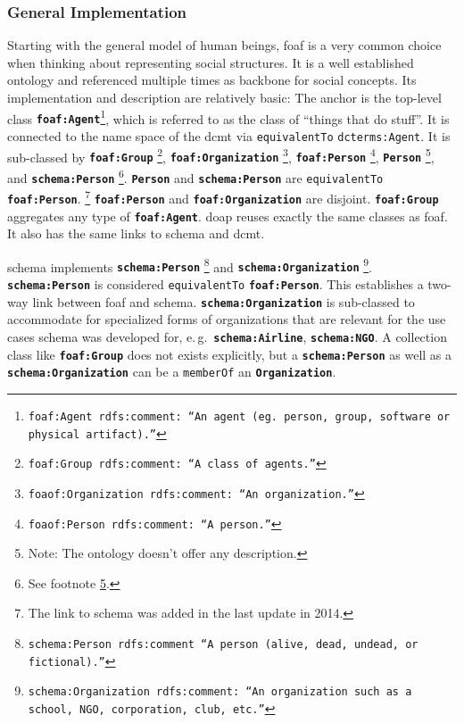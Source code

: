 \documentclass[a4paper, DIV=13, BCOR=0cm]{scrbook}
\newcommand{\eg}{e.\,g.\ }
\newcommand{\class}[1]{\texttt{\textbf{#1}}}
\newcommand{\relation}[1]{\texttt{#1}}
\newcommand{\foottt}[1]{\footnote{\texttt{#1}}}
\begin{document}
\subsubsection{General Implementation }
\label{human-beings-in-other-ontologies}
Starting with the general model of human beings, \gls{foaf} is a very common choice when thinking about representing social structures. It is a well established ontology and referenced multiple times as backbone for social concepts. Its implementation and description are relatively basic: The anchor is the top-level class \class{foaf:Agent}\foottt{foaf:Agent rdfs:comment: \enquote{An agent (eg. person, group, software or physical artifact).}}, which is referred to as the class of \enquote{things that do stuff}. It is connected to the name space of the \gls{dcmt} via \relation{equivalentTo} \relation{dcterms:Agent}. It is sub-classed by 
%
\class{foaf:Group}%
	\foottt{foaf:Group rdfs:comment: \enquote{A class of agents.}},
%
\class{foaf:Organization}%
	\foottt{foaof:Organization rdfs:comment: \enquote{An organization.}},
%
\class{foaf:Person}%
	\foottt{foaof:Person rdfs:comment: \enquote{A person.}},
%
\class{Person}%
	\footnote{\label{footn:no-desc}Note: The ontology doesn't offer any description.}, and
\class{schema:Person}%
	\footnote{See footnote \ref{footn:no-desc}.}.
\class{Person} and \class{schema:Person} are \relation{equivalentTo} \class{foaf:Person}.%
	\footnote{The link to \gls{schema} was added in the last update in 2014.} \class{foaf:Person} and \class{foaf:Organization} are disjoint. \class{foaf:Group} aggregates any type of \class{foaf:Agent}. \gls{doap} reuses exactly the same classes as \gls{foaf}. It also has the same links to \gls{schema} and \gls{dcmt}.

\gls{schema} implements
\class{schema:Person}%
	\foottt{schema:Person rdfs:comment \enquote{A person (alive, dead, undead, or fictional).}} and
%
\class{schema:Organization}%
	\foottt{schema:Organization rdfs:comment: \enquote{An organization such as a school, NGO, corporation, club, etc.}}.
%
\class{schema:Person} is considered \relation{equivalentTo} \class{foaf:Person}. This establishes a two-way link between \gls{foaf} and \gls{schema}. \class{schema:Organization} is sub-classed to accommodate for specialized forms of organizations that are relevant for the use cases schema was developed for, \eg \class{schema:Airline}, \class{schema:NGO}. A collection class like \class{foaf:Group} does not exists explicitly, but a \class{schema:Person} as well as a \class{schema:Organization} can be a \relation{memberOf} an \class{Organization}.
\end{document}

